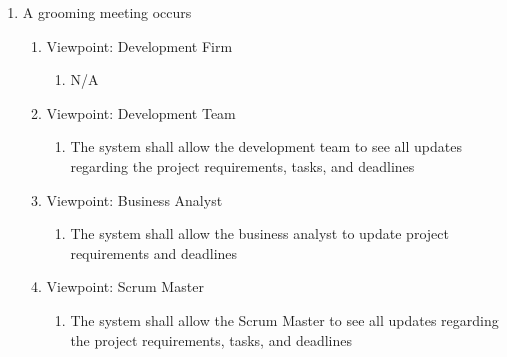 \documentclass[12pt, titlepage]{article}
\begin{document}
\begin{enumerate}[{BE}1.]
	\item A grooming meeting occurs %
	\begin{enumerate}[{VP}1.] 
	    \item Viewpoint: Development Firm
	        \begin{enumerate}
	            \item[] N/A
	        \end{enumerate}
	    \item Viewpoint: Development Team
	        \begin{enumerate}
	            \item The system shall allow the development team to see all updates regarding the project requirements, tasks, and deadlines
	        \end{enumerate}
		\item Viewpoint: Business Analyst
			\begin{enumerate}
			    \item The system shall allow the business analyst to update project requirements and deadlines
			\end{enumerate}
		\item Viewpoint: Scrum Master
			\begin{enumerate}
			    \item The system shall allow the Scrum Master to see all updates regarding the project requirements, tasks, and deadlines
			\end{enumerate}
	\end{enumerate}


\end{enumerate}
\end{document}
